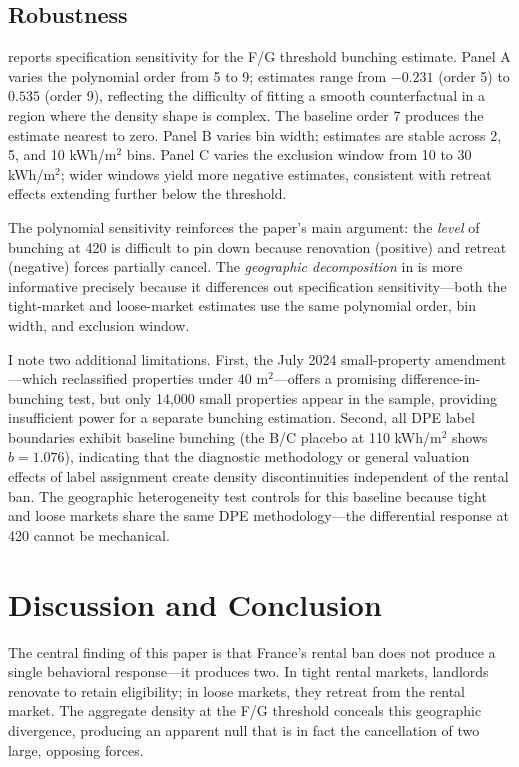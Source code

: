 \documentclass[12pt]{article}
\begin{document}
\subsection{Robustness}



 reports specification sensitivity for the F/G threshold bunching estimate. Panel A varies the polynomial order from 5 to 9; estimates range from $-0.231$ (order 5) to $0.535$ (order 9), reflecting the difficulty of fitting a smooth counterfactual in a region where the density shape is complex. The baseline order 7 produces the estimate nearest to zero. Panel B varies bin width; estimates are stable across 2, 5, and 10 kWh/m$^2$ bins. Panel C varies the exclusion window from 10 to 30 kWh/m$^2$; wider windows yield more negative estimates, consistent with retreat effects extending further below the threshold.

The polynomial sensitivity reinforces the paper's main argument: the \textit{level} of bunching at 420 is difficult to pin down because renovation (positive) and retreat (negative) forces partially cancel. The \textit{geographic decomposition} in  is more informative precisely because it differences out specification sensitivity---both the tight-market and loose-market estimates use the same polynomial order, bin width, and exclusion window.

I note two additional limitations. First, the July 2024 small-property amendment---which reclassified properties under 40 m$^2$---offers a promising difference-in-bunching test, but only 14,000 small properties appear in the sample, providing insufficient power for a separate bunching estimation. Second, all DPE label boundaries exhibit baseline bunching (the B/C placebo at 110 kWh/m$^2$ shows $b = 1.076$), indicating that the diagnostic methodology or general valuation effects of label assignment create density discontinuities independent of the rental ban. The geographic heterogeneity test controls for this baseline because tight and loose markets share the same DPE methodology---the differential response at 420 cannot be mechanical.


\section{Discussion and Conclusion}

The central finding of this paper is that France's rental ban does not produce a single behavioral response---it produces two. In tight rental markets, landlords renovate to retain eligibility; in loose markets, they retreat from the rental market. The aggregate density at the F/G threshold conceals this geographic divergence, producing an apparent null that is in fact the cancellation of two large, opposing forces.
\end{document}
